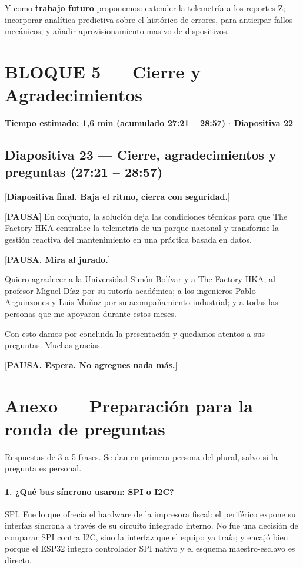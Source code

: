 \documentclass[11pt, a4paper]{article}
\begin{document}
Y como \textbf{trabajo futuro} proponemos: extender la telemetría a los reportes Z; incorporar analítica predictiva sobre el histórico de errores, para anticipar fallos mecánicos; y añadir aprovisionamiento masivo de dispositivos.

\hrulefill

\section*{BLOQUE 5 — Cierre y Agradecimientos}
\textbf{Tiempo estimado: 1,6 min (acumulado 27:21 – 28:57) $\cdot$ Diapositiva 22}

\subsection*{Diapositiva 23 — Cierre, agradecimientos y preguntas (27:21 – 28:57)}

[\textbf{Diapositiva final. Baja el ritmo, cierra con seguridad.}]

[\textbf{PAUSA}] En conjunto, la solución deja las condiciones técnicas para que The Factory HKA centralice la telemetría de un parque nacional y transforme la gestión reactiva del mantenimiento en una práctica basada en datos.

[\textbf{PAUSA. Mira al jurado.}]

Quiero agradecer a la Universidad Simón Bolívar y a The Factory HKA; al profesor Miguel Díaz por su tutoría académica; a los ingenieros Pablo Arguinzones y Luis Muñoz por su acompañamiento industrial; y a todas las personas que me apoyaron durante estos meses.

Con esto damos por concluida la presentación y quedamos atentos a sus preguntas. Muchas gracias.

[\textbf{PAUSA. Espera. No agregues nada más.}]

\hrulefill

\section*{Anexo — Preparación para la ronda de preguntas}

Respuestas de 3 a 5 frases. Se dan en primera persona del plural, salvo si la pregunta es personal.

\paragraph{1. ¿Qué bus síncrono usaron: SPI o I2C?}
SPI. Fue lo que ofrecía el hardware de la impresora fiscal: el periférico expone su interfaz síncrona a través de su circuito integrado interno. No fue una decisión de comparar SPI contra I2C, sino la interfaz que el equipo ya traía; y encajó bien porque el ESP32 integra controlador SPI nativo y el esquema maestro-esclavo es directo.
\end{document}
